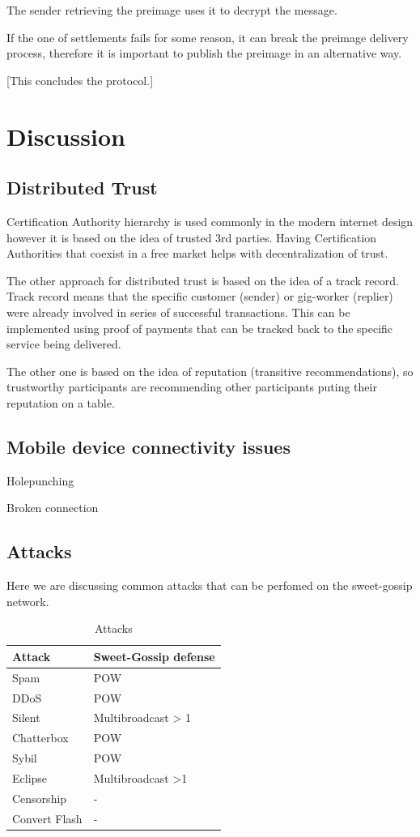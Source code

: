 \documentclass{article}
\begin{document}
The sender retrieving the preimage uses it to decrypt the message.

If the one of settlements fails for some reason, it can break the preimage delivery process, therefore it is important to publish the preimage in an alternative way.

[This concludes the protocol.]

\section{Discussion}

\subsection{Distributed Trust}

Certification Authority hierarchy is used commonly in the modern internet design however it is based on the idea of trusted 3rd parties. Having Certification Authorities that coexist in a free market helps with decentralization of trust.

The other approach for distributed trust is based on the idea of a track record. Track record means that the specific customer (sender) or gig-worker (replier) were already involved in series of successful transactions. This can be implemented using proof of payments that can be tracked back to the specific service being delivered.

The other one is based on the idea of reputation (transitive recommendations), so trustworthy participants are recommending other participants puting their reputation on a table.

\subsection{Mobile device connectivity issues}


Holepunching \cite{HolePunching}

Broken connection

\subsection{Attacks}
Here we are discussing common attacks that can be perfomed on the sweet-gossip network.


\begin{table}  
	\centering
	\begin{tabular}{ll}
		\toprule
		Attack         &   Sweet-Gossip defense \\
		\midrule
		Spam           & POW \\
		DDoS           & POW \\
		Silent         & Multibroadcast > 1 \\
		Chatterbox     & POW \\
		Sybil          & POW \\
		Eclipse        & Multibroadcast >1 \\
		Censorship     & - \\
		Convert Flash  & - \\
		\bottomrule
	\end{tabular}
	\label{tab:attacks}
	\caption{Attacks}
\end{table}
\end{document}
